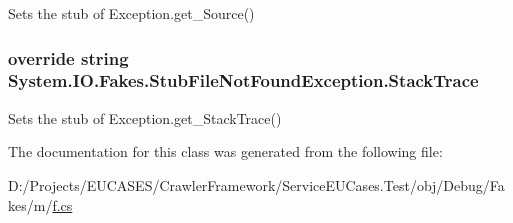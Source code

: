 Sets the stub of Exception.\-get\-\_\-\-Source()

\hypertarget{class_system_1_1_i_o_1_1_fakes_1_1_stub_file_not_found_exception_ac65aabd9aa5be70dde409b8466e59fcc}{
\subsubsection[{Stack\-Trace}]{\setlength{\rightskip}{0pt plus 5cm}override string System.\-I\-O.\-Fakes.\-Stub\-File\-Not\-Found\-Exception.\-Stack\-Trace\hspace{0.3cm}{\ttfamily [get]}}}\label{class_system_1_1_i_o_1_1_fakes_1_1_stub_file_not_found_exception_ac65aabd9aa5be70dde409b8466e59fcc}


Sets the stub of Exception.\-get\-\_\-\-Stack\-Trace()



The documentation for this class was generated from the following file\-:\begin{DoxyCompactItemize}
\item 
D\-:/\-Projects/\-E\-U\-C\-A\-S\-E\-S/\-Crawler\-Framework/\-Service\-E\-U\-Cases.\-Test/obj/\-Debug/\-Fakes/m/\hyperlink{m_2f_8cs}{f.\-cs}\end{DoxyCompactItemize}
